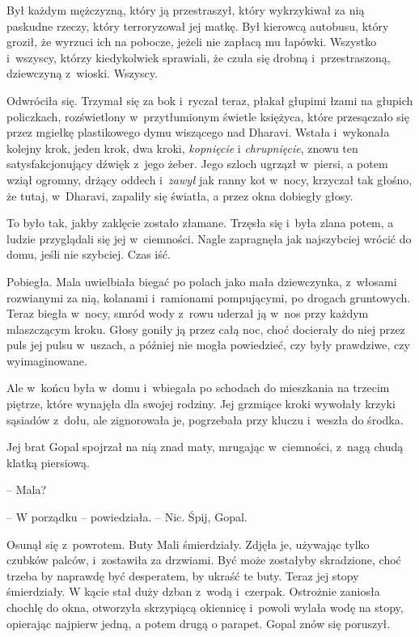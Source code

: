 \documentclass[oneside,polish,11pt,rmheadings]{mwbk}
\begin{document}
Był każdym mężczyzną, który ją przestraszył, który wykrzykiwał za nią paskudne rzeczy, który terroryzował jej matkę. Był kierowcą autobusu, który groził, że wyrzuci ich na pobocze, jeżeli nie zapłacą mu łapówki. Wszystko i~wszyscy, którzy kiedykolwiek sprawiali, że czuła się drobną i~przestraszoną, dziewczyną z~wioski. Wszyscy. 


Odwróciła się. Trzymał się za bok i~ryczał teraz, płakał głupimi łzami na głupich policzkach, rozświetlony w~przytłumionym świetle księżyca, które przesączało się przez mgiełkę plastikowego dymu wiszącego nad Dharavi. Wstała i~wykonała kolejny krok, jeden krok, dwa kroki, \textit{kopnięcie }i \textit{chrupnięcie}, znowu ten satysfakcjonujący dźwięk z~jego żeber. Jego szloch ugrzązł w~piersi, a potem wziął ogromny, drżący oddech i~\textit{zawył }jak ranny kot w~nocy, krzyczał tak głośno, że tutaj, w~Dharavi, zapaliły się światła, a przez okna dobiegły głosy. 


To było tak, jakby zaklęcie zostało złamane. Trzęsła się i~była zlana potem, a ludzie przyglądali się jej w~ciemności. Nagle zapragnęła jak najszybciej wrócić do domu, jeśli nie szybciej. Czas iść. 


Pobiegła. Mala uwielbiała biegać po polach jako mała dziewczynka, z~włosami rozwianymi za nią, kolanami i~ramionami pompującymi, po drogach gruntowych. Teraz biegła w~nocy, smród wody z~rowu uderzał ją w~nos przy każdym mlaszczącym kroku. Głosy goniły ją przez całą noc, choć docierały do niej przez puls jej pulsu w~uszach, a później nie mogła powiedzieć, czy były prawdziwe, czy wyimaginowane. 


Ale w~końcu była w~domu i~wbiegała po schodach do mieszkania na trzecim piętrze, które wynajęła dla swojej rodziny. Jej grzmiące kroki wywołały krzyki sąsiadów z~dołu, ale zignorowała je, pogrzebała przy kluczu i~weszła do środka. 


Jej brat Gopal spojrzał na nią znad maty, mrugając w~ciemności, z~nagą chudą klatką piersiową. 

-- Mala? 


-- W porządku -- powiedziała. -- Nic. Śpij, Gopal.  


Osunął się z~powrotem. Buty Mali śmierdziały. Zdjęła je, używając tylko czubków palców, i~zostawiła za drzwiami. Być może zostałyby skradzione, choć trzeba by naprawdę być desperatem, by ukraść te buty. Teraz jej stopy śmierdziały. W kącie stał duży dzban z~wodą i~czerpak. Ostrożnie zaniosła chochlę do okna, otworzyła skrzypiącą okiennicę i~powoli wylała wodę na stopy, opierając najpierw jedną, a potem drugą o parapet. Gopal znów się poruszył. 
\end{document}
